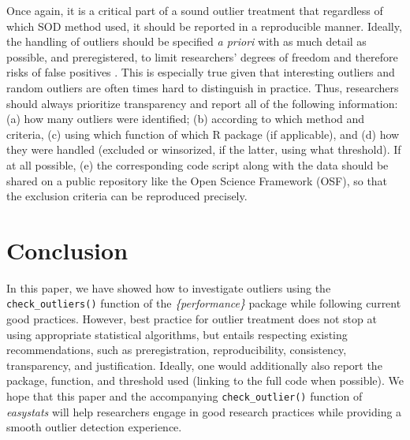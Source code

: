 \documentclass[mathematics,article,submit,moreauthors,pdftex]{mdpi}
\begin{document}
Once again, it is a critical part of a sound outlier treatment that
regardless of which SOD method used, it should be reported in a
reproducible manner. Ideally, the handling of outliers should be
specified \emph{a priori} with as much detail as possible, and
preregistered, to limit researchers' degrees of freedom and therefore
risks of false positives \citep{leys2019outliers}. This is especially
true given that interesting outliers and random outliers are often times
hard to distinguish in practice. Thus, researchers should always
prioritize transparency and report all of the following information: (a)
how many outliers were identified; (b) according to which method and
criteria, (c) using which function of which R package (if applicable),
and (d) how they were handled (excluded or winsorized, if the latter,
using what threshold). If at all possible, (e) the corresponding code
script along with the data should be shared on a public repository like
the Open Science Framework (OSF), so that the exclusion criteria can be
reproduced precisely.

\hypertarget{conclusion}{%
\section{Conclusion}\label{conclusion}}

In this paper, we have showed how to investigate outliers using the
\texttt{check\_outliers()} function of the \emph{\{performance\}}
package while following current good practices. However, best practice
for outlier treatment does not stop at using appropriate statistical
algorithms, but entails respecting existing recommendations, such as
preregistration, reproducibility, consistency, transparency, and
justification. Ideally, one would additionally also report the package,
function, and threshold used (linking to the full code when possible).
We hope that this paper and the accompanying \texttt{check\_outlier()}
function of \emph{easystats} will help researchers engage in good
research practices while providing a smooth outlier detection
experience.

%
\end{document}
